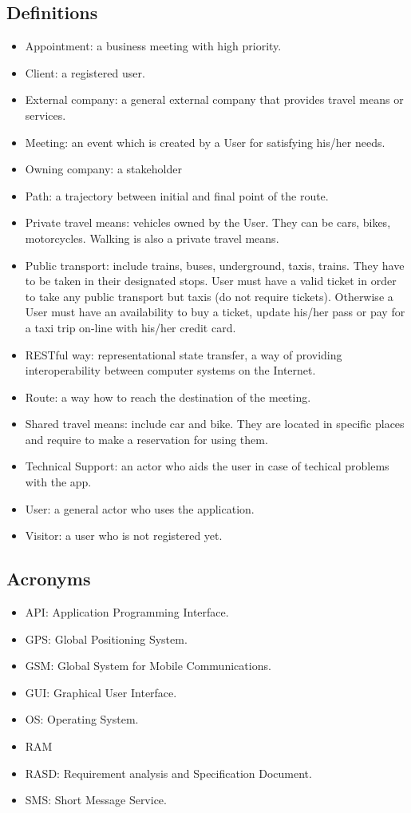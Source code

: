\documentclass[a4paper,leqno]{book}
\begin{document}
\subsection{Definitions}
\begin{itemize}
	\item Appointment: a business meeting with high priority.
	\item Client: a registered user.
	\item External company: a general external company that provides travel means or services.
	\item Meeting: an event which is created by a User for satisfying his/her needs.
	\item Owning company: a stakeholder
	\item Path: a trajectory between initial and final point of the route.
	\item Private travel means: vehicles owned by the User. They can be cars, bikes, motorcycles. Walking is also a private travel means.
	\item Public transport: include trains, buses, underground, taxis, trains. They have to be taken in their designated stops. User must have a valid ticket in order to take any public transport but taxis (do not require tickets). Otherwise a User must have an availability to buy a ticket, update his/her pass or pay for a taxi trip on-line with his/her credit card.
	\item RESTful way:  representational state transfer, a way of providing interoperability between computer systems on the Internet.
	\item Route: a way how to reach the destination of the meeting.
	\item Shared travel means: include car and bike. They are located in specific places and require to make a reservation for using them.
	\item Technical Support: an actor who aids the user in case of techical problems with the app.
	\item User: a general actor who uses the application.
	\item Visitor: a user who is not registered yet.
\end{itemize}

\subsection{Acronyms}
\begin{itemize}
	\item API: Application Programming Interface.
	\item GPS: Global Positioning System.
	\item GSM: Global System for Mobile Communications.
	\item GUI: Graphical User Interface.
	\item OS: Operating System.
	\item RAM 
	\item RASD: Requirement analysis and Specification Document.
	\item SMS: Short Message Service.
\end{itemize}
\end{document}
